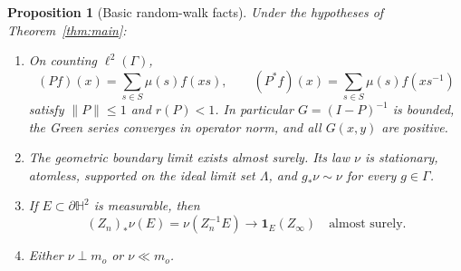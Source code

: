 \documentclass[11pt,a4paper]{article}
\newcommand{\HH}{\mathbb H^2}
\newcommand{\bd}{\partial\HH}
\newcommand{\Ga}{\Gamma}
\newcommand{\one}{\mathbf 1}
\newtheorem{proposition}[theorem]{Proposition}
\theoremstyle{definition}
\theoremstyle{remark}
\numberwithin{equation}{section}
\begin{document}
\begin{proposition}[Basic random-walk facts]\label{prop:basic}
Under the hypotheses of Theorem~\ref{thm:main}:
\begin{enumerate}
\item On counting $\ell^2(\Ga)$,
\[
 (Pf)(x)=\sum_{s\in S}\mu(s)f(xs),\qquad
 (P^*f)(x)=\sum_{s\in S}\mu(s)f(xs^{-1})
\]
satisfy $\|P\|\le1$ and $r(P)<1$. In particular $G=(I-P)^{-1}$ is bounded,
the Green series converges in operator norm, and all $G(x,y)$ are positive.
\item The geometric boundary limit exists almost surely. Its law $\nu$ is
stationary, atomless, supported on the ideal limit set $\Lambda$, and
$g_*\nu\sim\nu$ for every $g\in\Ga$.
\item If $E\subset\bd$ is measurable, then
\begin{equation}\label{eq:martingale}
 (Z_n)_*\nu(E)=\nu(Z_n^{-1}E)\longrightarrow\one_E(Z_\infty)
 \quad\text{almost surely}.
\end{equation}
\item Either $\nu\perp m_o$ or $\nu\ll m_o$.
\end{enumerate}
\end{proposition}
\end{document}
